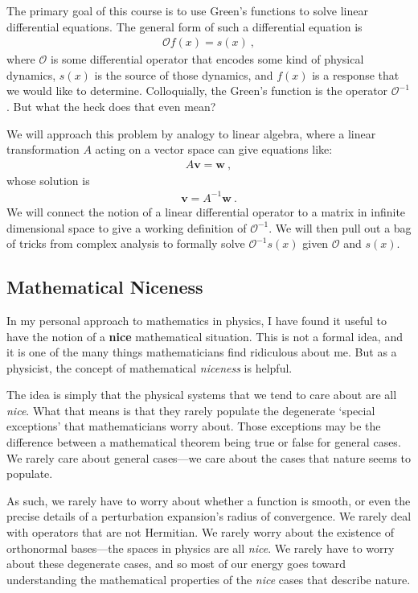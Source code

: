 \documentclass[12pt]{article}
\numberwithin{equation}{section}    %
\renewcommand{\vec}[1]{\mathbf{#1}} %
\begin{document}
The primary goal of this course is to use Green’s functions to solve  linear differential equations. The general form of such a differential equation is
\begin{align}
  \mathcal O f(x) = s(x) \ ,
\end{align}
where $\mathcal O$ is some differential operator that encodes some kind of physical dynamics, $s(x)$ is the source of those dynamics, and $f(x)$ is a response that we would like to determine. Colloquially, the Green’s function is the operator $\mathcal O^{-1}$. But what the heck does that even mean? 

We will approach this problem by analogy to linear algebra, where a linear transformation $A$ acting on a vector space can give equations like:
\begin{align}
  A \vec{v} = \vec{w} \ ,
\end{align}
whose solution is
\begin{align}
  \vec{v} = A^{-1} \vec{w} \ .
\end{align}
We will connect the notion of a linear differential operator to a matrix in infinite dimensional space to give a working definition of $\mathcal O^{-1}$. We will then pull out a bag of tricks from complex analysis to formally solve $\mathcal O^{-1}s(x)$ given $\mathcal O$ and $s(x)$. 




\subsection{Mathematical Niceness}

In my personal approach to mathematics in physics, I have found it useful to have the notion of a \textbf{nice} mathematical situation. This is not a formal idea, and it is one of the many things mathematicians find ridiculous about me. But as a physicist, the concept of mathematical \emph{niceness} is helpful. 

The idea is simply that the physical systems that we tend to care about are all \emph{nice}. What that means is that they rarely populate the degenerate `special exceptions’ that mathematicians worry about. Those exceptions may be the difference between a mathematical theorem being true or false for general cases. We rarely care about general cases---we care about the cases that nature seems to populate.

As such, we rarely have to worry about whether a function is smooth, or even the precise details of a perturbation expansion’s radius of convergence. We rarely deal with operators that are not Hermitian. We rarely worry about the existence of orthonormal bases---the spaces in physics are all \emph{nice}. We rarely have to worry about these degenerate cases, and so most of our energy goes toward understanding the mathematical properties of the \emph{nice} cases that describe nature.
\end{document}
